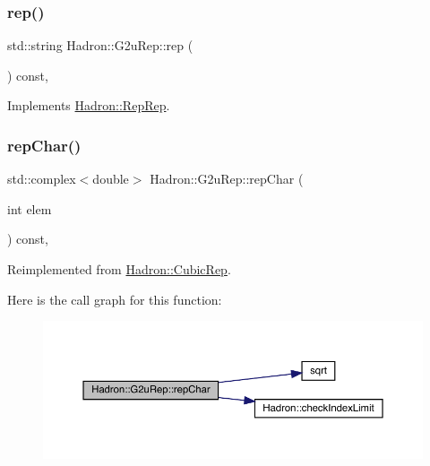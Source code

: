\mbox{\label{structHadron_1_1G2uRep_ad0a703d8c70aacc4601afb6c47ca40b3}} 
\subsubsection{\texorpdfstring{rep()}{rep()}\hspace{0.1cm}{\footnotesize\ttfamily [3/3]}}
{\footnotesize\ttfamily std\+::string Hadron\+::\+G2u\+Rep\+::rep (\begin{DoxyParamCaption}{ }\end{DoxyParamCaption}) const\hspace{0.3cm}{\ttfamily [inline]}, {\ttfamily [virtual]}}



Implements \mbox{\hyperlink{structHadron_1_1RepRep_ab3213025f6de249f7095892109575fde}{Hadron\+::\+Rep\+Rep}}.

\mbox{\label{structHadron_1_1G2uRep_a51ea6b7795e07c824b72dbefb7fb6ddb}} 
\subsubsection{\texorpdfstring{repChar()}{repChar()}\hspace{0.1cm}{\footnotesize\ttfamily [1/2]}}
{\footnotesize\ttfamily std\+::complex$<$double$>$ Hadron\+::\+G2u\+Rep\+::rep\+Char (\begin{DoxyParamCaption}\item[{int}]{elem }\end{DoxyParamCaption}) const\hspace{0.3cm}{\ttfamily [inline]}, {\ttfamily [virtual]}}



Reimplemented from \mbox{\hyperlink{structHadron_1_1CubicRep_af45227106e8e715e84b0af69cd3b36f8}{Hadron\+::\+Cubic\+Rep}}.

Here is the call graph for this function\+:
\nopagebreak
\begin{figure}[H]
\begin{center}
\leavevmode
\includegraphics[width=350pt]{dc/dc0/structHadron_1_1G2uRep_a51ea6b7795e07c824b72dbefb7fb6ddb_cgraph}
\end{center}
\end{figure}
\mbox{\label{structHadron_1_1G2uRep_a51ea6b7795e07c824b72dbefb7fb6ddb}} 
